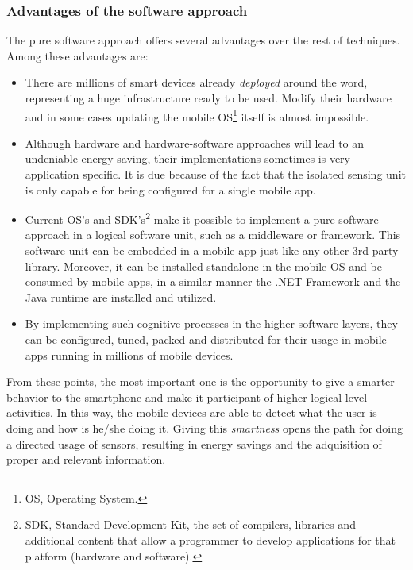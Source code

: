\subsubsection{Advantages of the software approach}
The pure software approach offers several advantages over the rest of techniques.
Among these advantages are:
\begin{itemize}
  \item There are millions of smart devices already \emph{deployed} around the word, representing a huge infrastructure ready to be used.
  Modify their hardware and in some cases updating the mobile OS\footnote{OS, Operating System.} itself is almost impossible.
  
  \item Although hardware and hardware-software approaches will lead to an undeniable energy saving, their implementations sometimes is very application specific.
  It is due because of the fact that the isolated sensing unit is only capable for being configured for a single mobile app.
  
  \item Current OS's and SDK's\footnote{SDK, Standard Development Kit, the set of compilers, libraries and additional content that allow a programmer to develop applications for that platform (hardware and software).} make it possible to implement a pure-software approach in a logical software unit, such as a middleware or framework.
  This software unit can be embedded in a mobile app just like any other 3rd party library.
  Moreover, it can be installed standalone in the mobile OS and be consumed by mobile apps, in a similar manner the .NET Framework and the Java runtime are installed and utilized.

  \item  By implementing such cognitive processes in the higher software layers, they can be configured, tuned, packed and distributed for their usage in mobile apps running in millions of mobile devices.
  
\end{itemize}

From these points, the most important one is the opportunity to give a smarter behavior to the smartphone and make it participant of higher logical level activities. In this way, the mobile devices are able to detect what the user is doing and how is he/she doing it. Giving this \emph{smartness} opens the path for doing a directed usage of sensors, resulting in energy savings and the adquisition of proper and relevant information.

